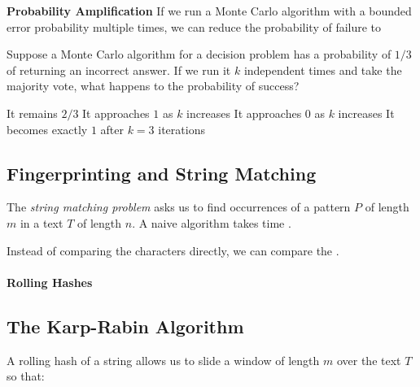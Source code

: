 \documentclass[11pt]{exam}
\begin{document}
	
	\vfill
	
	
	\textbf{Probability Amplification} If we run a Monte Carlo algorithm with a bounded error probability multiple times, we can reduce the probability of failure to  \\ %
	\vfill 
	
	\newpage
	
	\begin{Qu}
		Suppose a Monte Carlo algorithm for a decision problem has a probability of $1/3$ of returning an incorrect answer. If we run it $k$ independent times and take the majority vote, what happens to the probability of success?
		
		\begin{itemize}
			\aitem It remains $2/3$
			\bitem It approaches $1$ as $k$ increases
			\citem It approaches $0$ as $k$ increases
			\ditem It becomes exactly $1$ after $k = 3$ iterations
		\end{itemize}
		
	\end{Qu}
	
	
	\vs{3cm}
	
	\subsection{Fingerprinting and String Matching}
	The \emph{string matching problem} asks us to find occurrences of a pattern $P$ of length $m$ in a text $T$ of length $n$. A naive algorithm takes time . \\ %
	
	\vs{2cm}
	
	
	Instead of comparing the characters directly, we can compare the .
	
	
	\paragraph{Rolling Hashes}
	
	
	
	\newpage
	
	
	\subsection{The Karp-Rabin Algorithm}
	A rolling hash of a string allows us to slide a window of length $m$ over the text $T$ so that: \\
	
\end{document}
